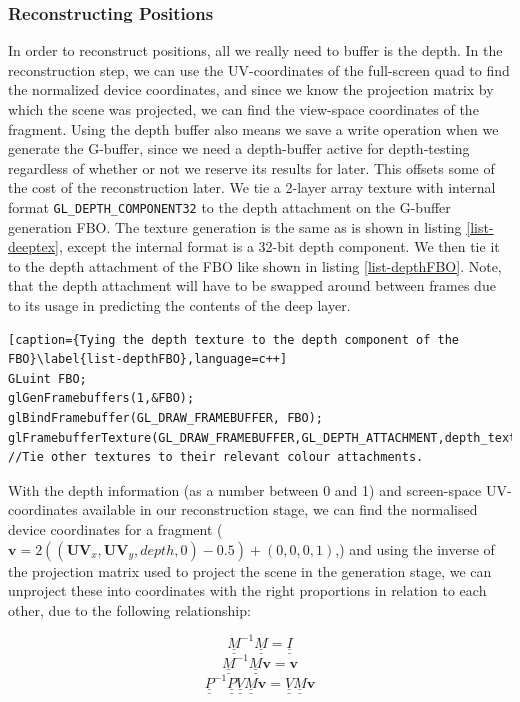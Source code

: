 \subsubsection{Reconstructing Positions}
In order to reconstruct positions, all we really need to buffer is the depth. In the reconstruction step, we can use the UV-coordinates of the full-screen quad to find the normalized device coordinates, and since we know the projection matrix by which the scene was projected, we can find the view-space coordinates of the fragment. Using the depth buffer also means we save a write operation when we generate the G-buffer, since we need a depth-buffer active for depth-testing regardless of whether or not we reserve its results for later. This offsets some of the cost of the reconstruction later. We tie a 2-layer array texture with internal format \verb=GL_DEPTH_COMPONENT32= to the depth attachment on the G-buffer generation FBO. The texture generation is the same as is shown in listing \ref{list-deeptex}, except the internal format is a 32-bit depth component. We then tie it to the depth attachment of the FBO like shown in listing \ref{list-depthFBO}. Note, that the depth attachment will have to be swapped around between frames due to its usage in predicting the contents of the deep layer.

\begin{lstlisting}[caption={Tying the depth texture to the depth component of the FBO}\label{list-depthFBO},language=c++]
GLuint FBO;
glGenFramebuffers(1,&FBO);
glBindFramebuffer(GL_DRAW_FRAMEBUFFER, FBO);
glFramebufferTexture(GL_DRAW_FRAMEBUFFER,GL_DEPTH_ATTACHMENT,depth_texture,0);
//Tie other textures to their relevant colour attachments.
\end{lstlisting}

With the depth information (as a number between 0 and 1) and screen-space UV-coordinates available in our reconstruction stage, we can find the normalised device coordinates for a fragment ($\mathbf{v} = 2((\mathbf{UV}_x,\mathbf{UV}_y,depth,0) - 0.5) + (0,0,0,1)$,) and using the inverse of the projection matrix used to project the scene in the generation stage, we can unproject these into coordinates with the right proportions in relation to each other, due to the following relationship:

$$\underline{\underline{M}}^{-1}\underline{\underline{M}} = \underline{\underline{I}}$$
$$\underline{\underline{M}}^{-1}\underline{\underline{M}} \mathbf{v} = \mathbf{v}$$
$$\underline{\underline{P}}^{-1}\underline{\underline{P}}\underline{\underline{V}}\underline{\underline{M}}\mathbf{v} = \underline{\underline{V}}\underline{\underline{M}}\mathbf{v}$$

